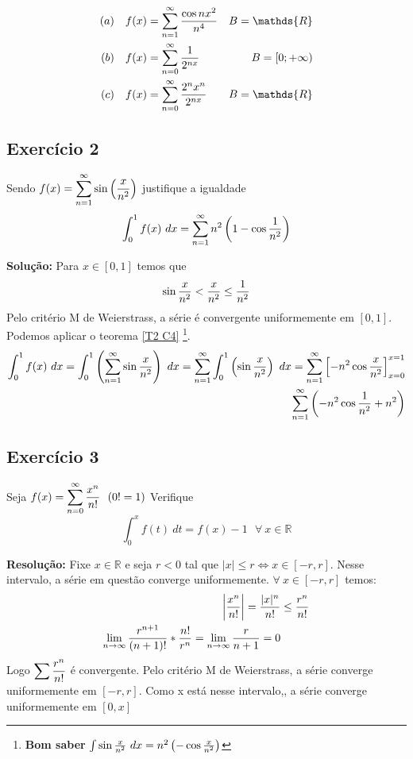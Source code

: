 \documentclass[12pt,openany, letterpaper]{book}
\newcommand{\LI}[1][n]{\lim_{{#1} \rightarrow \infty}}
\newcommand{\soma}[2][n]{\sum_{{#1} = #2}^\infty}
\newcommand{\E}[1]{Exercício #1}
\newcommand{\DS}{\displaystyle{}}
\begin{document}
\begin{align*}
(a) \ \ \ f(x) &= \soma{1} {\cos nx^2 \over n^4} & B = \mathds{R}\\
(b) \ \ \ f(x) &= \soma{0} {1 \over 2^{nx}} & B = [0; +\infty)\\
(c) \ \ \ f(x) &= \soma{0} {2^n x^n \over 2^{nx}} & B = \mathds{R} \\
\end{align*}

\subsection*{\E{2}}{Sendo $\displaystyle{f(x) = \soma{1} \sin \left( {x \over n^2}\right)}$ justifique a igualdade $$\int_0^1 f(x) \ dx = \soma{1} n^2 \left(1 -\cos {1 \over n^2}\right)$$

\textbf{Solução:} Para $x \in [0,1]$ temos que $$\sin {x \over n^2} < {x \over n^2} \leq {1 \over n^2}$$ Pelo critério M de Weierstrass, a série é convergente uniformemente em $[0,1]$. Podemos aplicar o teorema \ref{T2 C4} \footnote{\textbf{Bom saber} $\int \sin{x \over n^2}\ dx = n^2 \left(-\cos{x \over n^2}\right)$}. \begin{align*}
\int_0^1 f(x) \ dx = \int_0^1 \left( \soma{1} \sin {x \over n^2} \right) \ dx = \soma{1} \int_0^1 \left( \sin {x \over n^2} \right) \ dx = \soma{1} \left[ -n^2 \cos{x \over n^2} \right]_{x = 0}^{x = 1}\\
\soma{1} \left( -n^2\cos{1 \over n^2} +n^2 \right)
\end{align*}

\subsection*{\E{3}}{Seja $\displaystyle{f(x) = \soma{0}  {x^n \over n!} \ \ (0! = 1)}$ Verifique $$\int_0^x f(t) \ dt = f(x) -1 \ \ \ \forall \ x \in \mathds{R}$$}

\textbf{Resolução:} Fixe $x \in \mathds{R}$ e seja $r < 0$ tal que $|x| \leq r \Longleftrightarrow x \in [-r,r]$. Nesse intervalo, a série em questão converge uniformemente. $\forall \ x \in [-r, r]$ temos: \begin{align*}
\left| \frac{x^n}{n!} \right| = {|x|^n \over n!} &\leq {r^n \over n!} \\
\LI {r^{n+1} \over (n+1)!}*{n! \over r^n} = \LI {r \over n+1} = 0
\end{align*} 
Logo $\DS{\sum {r^n \over n!}}$ é convergente. Pelo critério M de Weierstrass, a série converge uniformemente em $[-r,r]$. Como x está nesse  intervalo,, a série converge uniformemente em $[0,x]$

}
\end{document}
